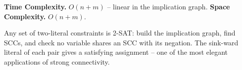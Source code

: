 \begin{complexitybox}
\textbf{Time Complexity.} $O(n+m)$ -- linear in the implication graph.
\textbf{Space Complexity.} $O(n+m)$.
\end{complexitybox}

\begin{takeawaybox}
Any set of two-literal constraints is 2-SAT: build the implication graph,
find SCCs, and check no variable shares an SCC with its negation. The
sink-ward literal of each pair gives a satisfying assignment -- one of the
most elegant applications of strong connectivity.
\end{takeawaybox}

